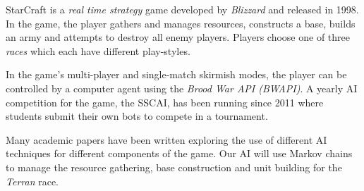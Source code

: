 StarCraft is a \textit{real time strategy} game developed by \textit{Blizzard} and released in 1998. In the game, the player gathers and manages resources, constructs a base, builds an army and attempts to destroy all enemy players. Players choose one of three \textit{races} which each have different play-styles.

In the game's multi-player and single-match skirmish modes, the player can be controlled by a computer agent using the \textit{Brood War API (BWAPI)}. A yearly AI competition for the game, the SSCAI, has been running since 2011 where students submit their own bots to compete in a tournament.

Many academic papers have been written exploring the use of different AI techniques for different components of the game. Our AI will use Markov chains to manage the resource gathering, base construction and unit building for the \textit{Terran} race.
